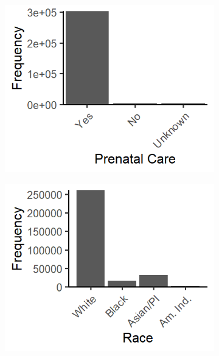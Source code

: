 \documentclass[12pt]{article}
\begin{document}
\begin{figure}[!ht]
    \centering
    \begin{subfigure}{.3\textwidth}
        \includegraphics[width=\textwidth]{supp-img/dens_pren.png}
    \vspace{.5cm}
    \end{subfigure}\hfill
    \begin{subfigure}{.3\textwidth}
        \includegraphics[width=\textwidth]{supp-img/dens_race.png}
    \vspace{.5cm}
    \end{subfigure}\hfill
    \begin{subfigure}{.3\textwidth}

\end{subfigure}
\end{figure}
\end{document}

